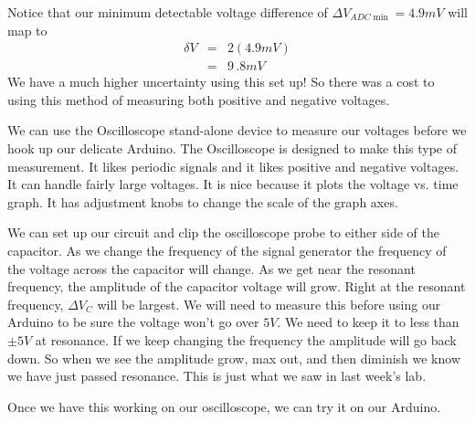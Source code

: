 \bigskip

Notice that our minimum detectable voltage difference of $\Delta V_{ADC\min
}=4.9\unit{mV}$ will map to 
\begin{eqnarray*}
\delta V &=&2\left( 4.9\unit{mV}\right) \\
&=&9\,.8\unit{mV}
\end{eqnarray*}%
We have a much higher uncertainty using this set up! So there was a cost to
using this method of measuring both positive and negative voltages.

We can use the Oscilloscope stand-alone device to measure our voltages
before we hook up our delicate Arduino. The Oscilloscope is designed to make
this type of measurement. It likes periodic signals and it likes positive
and negative voltages. It can handle fairly large voltages. It is nice
because it plots the voltage vs. time graph. It has adjustment knobs to
change the scale of the graph axes.

We can set up our circuit and clip the oscilloscope probe to either side of
the capacitor. As we change the frequency of the signal generator the
frequency of the voltage across the capacitor will change. As we get near
the resonant frequency, the amplitude of the capacitor voltage will grow.
Right at the resonant frequency, $\Delta V_{C}$ will be largest. We will
need to measure this before using our Arduino to be sure the voltage won't
go over $5\unit{V}$. We need to keep it to less than $\pm 5\unit{V}$ at
resonance. If we keep changing the frequency the amplitude will go back
down. So when we see the amplitude grow, max out, and then diminish we know
we have just passed resonance. This is just what we saw in last week's lab.

Once we have this working on our oscilloscope, we can try it on our Arduino.

